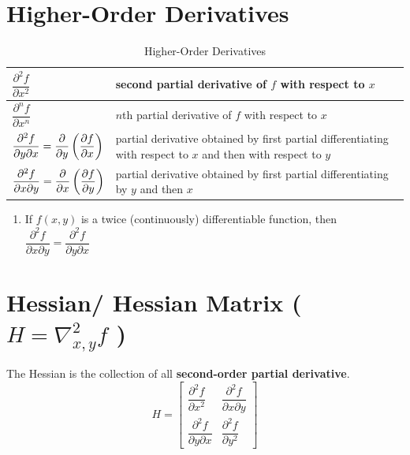 \section{Higher-Order Derivatives}\label{Higher-Order Derivatives}

\begin{customTableWrapper}{2.2}
\begin{table}[H]
    \centering
    \begin{tabular}{|p{3cm}|p{12cm}|}
        \hline
        $\dfrac{\partial^2 f}{\partial x^2}$ & second partial derivative of $f$ with respect to $x$ \\
        \hline

        $\dfrac{\partial^n f}{\partial x^n}$ & $n$th partial derivative of $f$ with respect to $x$ \\
        \hline

        $\dfrac{\partial^2 f}{\partial y \partial x} = \dfrac{\partial}{\partial y}\left( \dfrac{\partial f}{\partial x} \right)$ & partial derivative obtained by first partial differentiating with respect to $x$ and then with respect to $y$ \\
        \hline

        $\dfrac{\partial^2 f}{\partial x \partial y} = \dfrac{\partial}{\partial x}\left( \dfrac{\partial f}{\partial y} \right)$ & partial derivative obtained by first partial differentiating by $y$ and then $x$ \\
        \hline
    \end{tabular}
    \caption{Higher-Order Derivatives}
\end{table}
\end{customTableWrapper}


\begin{enumerate}
    \item If $f(x, y)$ is a twice (continuously) differentiable function, then 
    $\dfrac{\partial^2 f}{\partial x \partial y} = \dfrac{\partial^2 f}{\partial y \partial x}$

\end{enumerate}


\section{Hessian/ Hessian Matrix ( $H = \nabla_{x,y}^2f$ )}\label{Hessian/ Hessian Matrix}
The Hessian is the collection of all \textbf{second-order partial derivative}.
\[
    H = 
    \begin{bmatrix}
        \dfrac{\partial^2 f}{\partial x^2} &
        \dfrac{\partial^2 f}{\partial x \partial y}\\
        \dfrac{\partial^2 f}{\partial y \partial x} &
        \dfrac{\partial^2 f}{\partial y^2}
    \end{bmatrix}
\]



